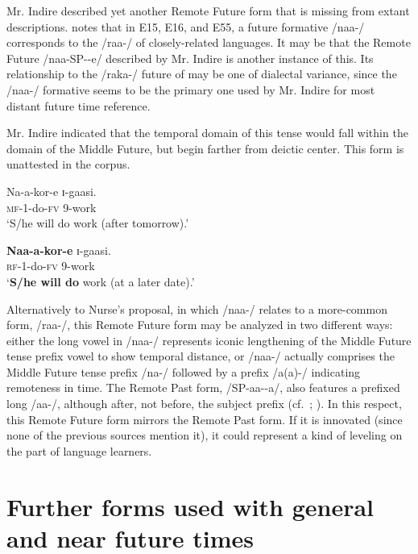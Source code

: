 \documentclass[output=paper]{langsci/langscibook}
\begin{document}
Mr. Indire described yet another  Remote Future form that is missing from extant descriptions. \citet[86, fn c]{Nurse2008} notes that in  E15, E16, and E55, a future formative /naa-/ corresponds to the /raa-/ of closely-related  languages. It may be that the  Remote Future /naa-SP-{\longrule}-e/ described by {Mr. Indire} is another instance of this. Its relationship to the /raka-/ future of  may be one of dialectal variance, since the /naa-/ formative seems to be the primary one used by {Mr. Indire} for most distant future time reference.

{Mr. Indire} indicated that the temporal domain of this tense would fall within the domain of the Middle Future, but begin farther from deictic center. This form is unattested in the corpus.

\ea\label{ex:sarvasy:16}
\gll Na-a-kor-e  ɪ-gaasi. \\
\textsc{mf}-1-do-\textsc{fv}  9-work \\
\glt ‘S/he will do work (after tomorrow).’
\z 

\ea\label{ex:sarvasy:17}
\gll \textbf{Naa-a-kor-e}  ɪ-gaasi. \\
\textsc{rf}-1-do-\textsc{fv}  9-work \\
\glt ‘\textbf{S/he will do} work (at a later date).’
\z

Alternatively to Nurse’s proposal, in which /naa-/ relates to a more-common  form, /raa-/, this Remote Future form may be analyzed in two different ways: either the long vowel in /naa-/ represents iconic lengthening of the Middle Future tense prefix vowel to show temporal distance, or /naa-/ actually comprises the Middle Future tense prefix /na-/ followed by a prefix /a(a)-/ indicating remoteness in time. The  Remote Past form, /SP-aa-{\longrule}-a/, also features a prefixed long /aa-/, although after, not before, the subject prefix (cf.\ \citealt[206]{Mould1981}; \citealt[323]{Leung1991}). In this respect, this Remote Future form mirrors the Remote Past form. If it is innovated (since none of the previous sources mention it), it could represent a kind of leveling on the part of language learners.

\section[Further forms used with general and near future times]{Further forms used with general and near future times}
\label{sec:sarvasy:7}
\end{document}
